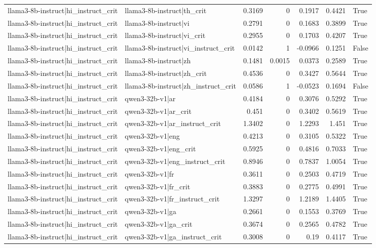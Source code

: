 \begin{table}
\begin{tabular}{l l r r r r l}
llama3-8b-instruct|hi_instruct_crit & llama3-8b-instruct|th_crit & 0.3169 & 0 & 0.1917 & 0.4421 & True \\
llama3-8b-instruct|hi_instruct_crit & llama3-8b-instruct|vi & 0.2791 & 0 & 0.1683 & 0.3899 & True \\
llama3-8b-instruct|hi_instruct_crit & llama3-8b-instruct|vi_crit & 0.2955 & 0 & 0.1703 & 0.4207 & True \\
llama3-8b-instruct|hi_instruct_crit & llama3-8b-instruct|vi_instruct_crit & 0.0142 & 1 & -0.0966 & 0.1251 & False \\
llama3-8b-instruct|hi_instruct_crit & llama3-8b-instruct|zh & 0.1481 & 0.0015 & 0.0373 & 0.2589 & True \\
llama3-8b-instruct|hi_instruct_crit & llama3-8b-instruct|zh_crit & 0.4536 & 0 & 0.3427 & 0.5644 & True \\
llama3-8b-instruct|hi_instruct_crit & llama3-8b-instruct|zh_instruct_crit & 0.0586 & 1 & -0.0523 & 0.1694 & False \\
llama3-8b-instruct|hi_instruct_crit & qwen3-32b-v1|ar & 0.4184 & 0 & 0.3076 & 0.5292 & True \\
llama3-8b-instruct|hi_instruct_crit & qwen3-32b-v1|ar_crit & 0.451 & 0 & 0.3402 & 0.5619 & True \\
llama3-8b-instruct|hi_instruct_crit & qwen3-32b-v1|ar_instruct_crit & 1.3402 & 0 & 1.2293 & 1.451 & True \\
llama3-8b-instruct|hi_instruct_crit & qwen3-32b-v1|eng & 0.4213 & 0 & 0.3105 & 0.5322 & True \\
llama3-8b-instruct|hi_instruct_crit & qwen3-32b-v1|eng_crit & 0.5925 & 0 & 0.4816 & 0.7033 & True \\
llama3-8b-instruct|hi_instruct_crit & qwen3-32b-v1|eng_instruct_crit & 0.8946 & 0 & 0.7837 & 1.0054 & True \\
llama3-8b-instruct|hi_instruct_crit & qwen3-32b-v1|fr & 0.3611 & 0 & 0.2503 & 0.4719 & True \\
llama3-8b-instruct|hi_instruct_crit & qwen3-32b-v1|fr_crit & 0.3883 & 0 & 0.2775 & 0.4991 & True \\
llama3-8b-instruct|hi_instruct_crit & qwen3-32b-v1|fr_instruct_crit & 1.3297 & 0 & 1.2189 & 1.4405 & True \\
llama3-8b-instruct|hi_instruct_crit & qwen3-32b-v1|ga & 0.2661 & 0 & 0.1553 & 0.3769 & True \\
llama3-8b-instruct|hi_instruct_crit & qwen3-32b-v1|ga_crit & 0.3674 & 0 & 0.2565 & 0.4782 & True \\
llama3-8b-instruct|hi_instruct_crit & qwen3-32b-v1|ga_instruct_crit & 0.3008 & 0 & 0.19 & 0.4117 & True \\

\end{tabular}
\end{table}
